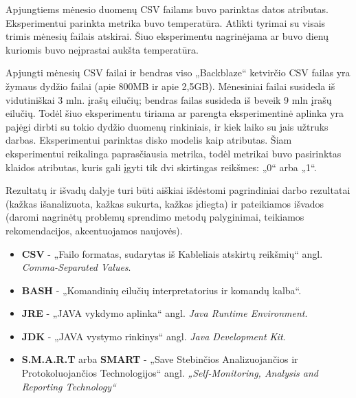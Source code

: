 \documentclass{VUMIFPSkursinis}
\begin{document}
Apjungtiems mėnesio duomenų CSV failams buvo parinktas datos atributas. Eksperimentui parinkta metrika buvo temperatūra. Atlikti tyrimai su visais trimis mėnesių failais atskirai. Šiuo eksperimentu nagrinėjama ar buvo dienų kuriomis buvo neįprastai aukšta temperatūra.


Apjungti mėnesių CSV failai ir bendras viso „Backblaze“ ketvirčio CSV failas yra žymaus dydžio failai (apie 800MB ir apie 2,5GB). Mėnesiniai failai susideda iš vidutiniškai 3 mln. įrašų eilučių; bendras failas susideda iš beveik 9 mln įrašų eilučių. Todėl šiuo eksperimentu tiriama ar parengta eksperimentinė aplinka yra pajėgi dirbti su tokio dydžio duomenų rinkiniais, ir kiek laiko su jais užtruks darbas. Eksperimentui parinktas disko modelis kaip atributas. Šiam eksperimentui reikalinga paprasčiausia metrika, todėl metrikai buvo pasirinktas klaidos atributas, kuris gali įgyti tik dvi skirtingas reikšmes: „0“ arba „1“.


Rezultatų ir išvadų dalyje turi būti aiškiai išdėstomi pagrindiniai darbo
rezultatai (kažkas išanalizuota, kažkas sukurta, kažkas įdiegta) ir pateikiamos
išvados (daromi nagrinėtų problemų sprendimo metodų palyginimai, teikiamos
rekomendacijos, akcentuojamos naujovės).

\printbibliography[heading=bibintoc]

\begin{itemize}
\item \textbf{CSV} - „Failo formatas, sudarytas iš Kableliais atskirtų reikšmių“ angl. \textit{Comma-Separated Values}.

\item \textbf{BASH} - „Komandinių eilučių interpretatorius ir komandų kalba“.

\item \textbf{JRE} - „JAVA vykdymo aplinka“ angl. \textit{Java Runtime Environment}.

\item \textbf{JDK} - „JAVA vystymo rinkinys“ angl. \textit{Java Development Kit}.

\item \textbf{S.M.A.R.T} arba \textbf{SMART} - „Save Stebinčios Analizuojančios ir Protokoluojančios Technologijos“ angl. \textit{„Self-Monitoring, Analysis and Reporting Technology“}

\end{itemize}
\end{document}
